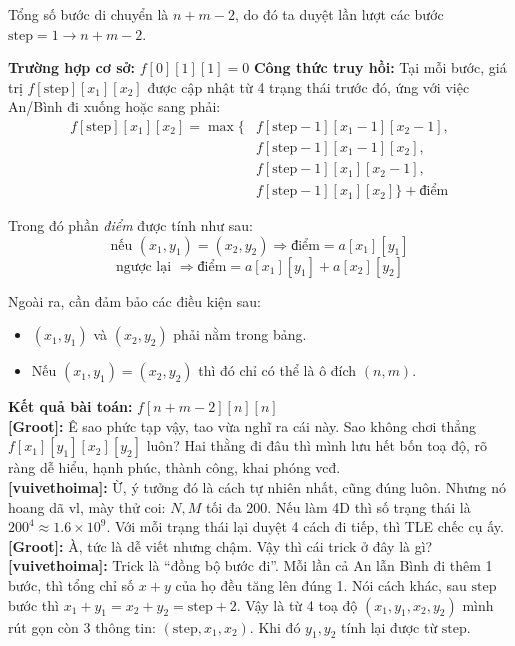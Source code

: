 Tổng số bước di chuyển là $n + m - 2$, do đó ta duyệt lần lượt các bước $\text{step} = 1 \rightarrow n + m - 2$.

\textbf{Trường hợp cơ sở:} $f[0][1][1] = 0$
\textbf{Công thức truy hồi:}  
Tại mỗi bước, giá trị $f[\text{step}][x_1][x_2]$ được cập nhật từ 4 trạng thái trước đó, ứng với việc An/Bình đi xuống hoặc sang phải:
\[
\begin{aligned}
f[\text{step}][x_1][x_2] = \max \Big\{ 
   & f[\text{step} - 1][x_1 - 1][x_2 - 1], \\
   & f[\text{step} - 1][x_1 - 1][x_2], \\
   & f[\text{step} - 1][x_1][x_2 - 1], \\
   & f[\text{step} - 1][x_1][x_2] 
\Big\} + \text{điểm}
\end{aligned}
\]

Trong đó phần \textit{điểm} được tính như sau:
\[
\text{nếu } (x_1, y_1) = (x_2, y_2) \Rightarrow \text{điểm} = a[x_1][y_1]
\]
\[
\text{ngược lại } \Rightarrow \text{điểm} = a[x_1][y_1] + a[x_2][y_2]
\]

Ngoài ra, cần đảm bảo các điều kiện sau:
\begin{itemize}
    \item $(x_1, y_1)$ và $(x_2, y_2)$ phải nằm trong bảng.
    \item Nếu $(x_1, y_1) = (x_2, y_2)$ thì đó chỉ có thể là ô đích $(n,m)$.
\end{itemize}

\textbf{Kết quả bài toán:} $f[n + m - 2][n][n]$\\

\textbf{[Groot]:} Ê sao phức tạp vậy, tao vừa nghĩ ra cái này. Sao không chơi thẳng $f[x_1][y_1][x_2][y_2]$ luôn?  
Hai thằng đi đâu thì mình lưu hết bốn toạ độ, rõ ràng dễ hiểu, hạnh phúc, thành công, khai phóng vcđ.\\

\textbf{[vuivethoima]:} Ừ, ý tưởng đó là cách tự nhiên nhất, cũng đúng luôn.  
Nhưng nó hoang dã vl, mày thử coi: $N, M$ tối đa 200.  
Nếu làm 4D thì số trạng thái là $200^4 \approx 1.6 \times 10^9$.  
Với mỗi trạng thái lại duyệt 4 cách đi tiếp, thì TLE chếc cụ ấy.\\

\textbf{[Groot]:} À, tức là dễ viết nhưng chậm. Vậy thì cái trick ở đây là gì?\\

\textbf{[vuivethoima]:} Trick là ``đồng bộ bước đi''.  
Mỗi lần cả An lẫn Bình đi thêm 1 bước, thì tổng chỉ số $x+y$ của họ đều tăng lên đúng 1.  
Nói cách khác, sau $\text{step}$ bước thì $x_1+y_1 = x_2+y_2 = \text{step}+2$.  
Vậy là từ 4 toạ độ $(x_1,y_1,x_2,y_2)$ mình rút gọn còn 3 thông tin: $(\text{step}, x_1, x_2)$.  
Khi đó $y_1, y_2$ tính lại được từ $\text{step}$.\\

